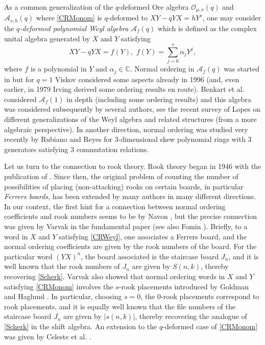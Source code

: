 \documentclass[10pt]{amsart}
\begin{document}
As a common generalization of the $q$-deformed Ore algebra ${\mathcal O}_{\mu,\nu}(q)$ and $\mathcal{A}_{s;h}(q)$ where \eqref{CRMonom} is $q$-deformed to $XY-qYX=hY^s$, one may consider the {\em $q$-deformed polynomial Weyl algebra} $\mathcal{A}_{f}(q)$ which is defined as the complex unital algebra generated by $X$ and $Y$ satisfying
\begin{equation}\label{CRParWeyl}
XY-qYX=f(Y), \,\, f(Y)=\sum_{j=0}^s \alpha_j Y^j,
\end{equation}
where $f$ is a polynomial in $Y$ and $\alpha_j \in \mathbb{C}$. Normal ordering in $\mathcal{A}_{f}(q)$ was started in \cite{TMMS2011} but for $q=1$ Viskov \cite{OVV1996} considered some aspects already in 1996 (and, even earlier, in 1979 Irving \cite{RSI1979} derived some ordering results en route). Benkart et al. \cite{BLO2013,BLO2015,BLO2015a} considered $\mathcal{A}_{f}(1)$ in depth (including some ordering results) and this algebra was considered subsequently by several authors, see the recent survey of Lopes \cite{Lopes2024} on different generalizations of the Weyl algebra and related structures (from a more algebraic perspective). In another direction, normal ordering was studied very recently  by Rubiano and Reyes \cite{ARAR2026} for 3-dimensional skew polynomial rings with 3 generators satisfying 3 commutation relations. 

Let us turn to the connection to rook theory. Rook theory began in 1946 with the publication of \cite{KR1946}. Since then, the original problem of counting the number of possibilities of placing (non-attacking) rooks on certain boards, in particular {\it Ferrers boards}, has been extended by many authors in many different directions. In our context, the first hint for a connection between normal ordering coefficients and rook numbers seems to be by Navon \cite{AMN1973}, but the precise connection was given by Varvak in the fundamental paper \cite{AV2005} (see also Fomin \cite{SF1995}). Briefly, to a word in $X$ and $Y$ satisfying \eqref{CRWeyl}, one associates a Ferrers board, and the normal ordering coefficients are given by the rook numbers of the board. For the particular word $(YX)^n$, the board associated is the staircase board $J_n$, and it is well known that the rook numbers of $J_n$ are given by $S(n,k)$, thereby recovering \eqref{Scherk}. Varvak also showed that normal ordering words in $X$ and $Y$ satisfying \eqref{CRMonom} involves the $s$-rook placements introduced by Goldman and Haglund \cite{JGJH2000}. In particular, choosing $s=0$, the $0$-rook placements correspond to rook placements, and it is equally well known that the file numbers of the staircase board $J_n$ are given by $|s(n,k)|$, thereby recovering the analogue of \eqref{Scherk} in the shift algebra. An extension to the $q$-deformed case of \eqref{CRMonom} was given by Celeste et al. \cite{CCG2017}.
 
\end{document}
